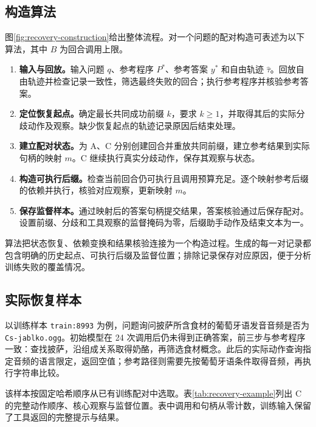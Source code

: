 \subsection{构造算法}

图\ref{fig:recovery-construction}给出整体流程。对一个问题的配对构造可表述为以下算法，其中 $B$ 为回合调用上限。
\begin{enumerate}
\item \textbf{输入与回放。}输入问题 $q$、参考程序 $P^*$、参考答案 $y^*$ 和自由轨迹 $\hat\tau$。回放自由轨迹并检查记录一致性，筛选最终失败的回合；执行参考程序并核验参考答案。
\item \textbf{定位恢复起点。}确定最长共同成功前缀 $k$，要求 $k\geq1$，并取得其后的实际分歧动作及观察。缺少恢复起点的轨迹记录原因后结束处理。
\item \textbf{建立配对状态。}为 A、C 分别创建回合并重放共同前缀，建立参考结果到实际句柄的映射 $m$。C 继续执行真实分歧动作，保存其观察与状态。
\item \textbf{构造可执行后缀。}检查当前回合仍可执行且调用预算充足。逐个映射参考后缀的依赖并执行，核验对应观察，更新映射 $m$。
\item \textbf{保存监督样本。}通过映射后的答案句柄提交结果，答案核验通过后保存配对。设置前缀、分歧和工具观察的监督掩码为零，后缀助手动作及结束文本为一。
\end{enumerate}

算法把状态恢复、依赖变换和结果核验连接为一个构造过程。生成的每一对记录都包含明确的历史起点、可执行后缀及监督位置；排除记录保存对应原因，便于分析训练失败的覆盖情况。

\subsection{实际恢复样本}

以训练样本 \texttt{train:8993} 为例，问题询问披萨所含食材的葡萄牙语发音音频是否为 \texttt{Cs-jablko.ogg}。初始模型在 24 次调用后仍未得到正确答案，前三步与参考程序一致：查找披萨，沿组成关系取得奶酪，再筛选食材概念。此后的实际动作查询指定音频的语言限定，返回空值；参考路径则需要先按葡萄牙语条件取得音频，再执行字符串比较。

该样本按固定哈希顺序从已有训练配对中选取。表\ref{tab:recovery-example}列出 C 的完整动作顺序、核心观察与监督位置。表中调用和句柄从零计数，训练输入保留了工具返回的完整提示与结果。

